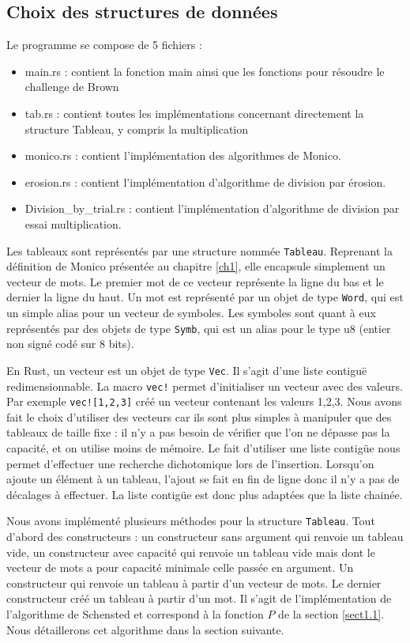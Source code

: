 \subsection{Choix des structures de données}
Le programme se compose de 5 fichiers : 
\begin{itemize}[label=-, parsep=0cm, itemsep=0cm]
	\item main.rs : contient la fonction main ainsi que les fonctions pour résoudre le challenge de Brown
	\item tab.rs : contient toutes les implémentations concernant directement la structure Tableau, y compris la multiplication
	\item monico.rs : contient l'implémentation des algorithmes de Monico.
	\item erosion.rs : contient l'implémentation d'algorithme de division par érosion.
	\item Division\_by\_trial.rs : contient l'implémentation d'algorithme de division par essai multiplication. 
\end{itemize}

Les tableaux sont représentés par une structure nommée \texttt{Tableau}. Reprenant la définition de Monico présentée au chapitre \ref{ch1}, elle encapsule simplement un vecteur de mots. Le premier mot de ce vecteur représente la ligne du bas et le dernier la ligne du haut. Un mot est représenté par un objet de type \texttt{Word}, qui est un simple alias pour un vecteur de symboles. Les symboles sont quant à eux représentés par des objets de type \texttt{Symb}, qui est un alias pour le type u8 (entier non signé codé sur 8 bits). 

En Rust, un vecteur est un objet de type \texttt{Vec}. Il s'agit d'une liste contiguë redimensionnable. La macro \texttt{vec!} permet d'initialiser un vecteur avec des valeurs. Par exemple \texttt{vec![1,2,3]} créé un vecteur contenant les valeurs 1,2,3. Nous avons fait le choix d'utiliser des vecteurs car ils sont plus simples à manipuler que des tableaux de taille fixe : il n'y a pas besoin de vérifier que l'on ne dépasse pas la capacité, et on utilise moins de mémoire. Le fait d'utiliser une liste contigüe nous permet d'effectuer une recherche dichotomique lors de l'insertion. Lorsqu'on ajoute un élément à un tableau, l'ajout se fait en fin de ligne donc il n'y a pas de décalages à effectuer. La liste contigüe est donc plus adaptées que la liste chainée.

Nous avons implémenté plusieurs méthodes pour la structure \texttt{Tableau}. Tout d'abord des constructeurs : un constructeur sans argument qui renvoie un tableau vide, un constructeur avec capacité qui renvoie un tableau vide mais dont le vecteur de mots a pour capacité minimale celle passée en argument. Un constructeur qui renvoie un tableau à partir d'un vecteur de mots. Le dernier constructeur créé un tableau à partir d'un mot. Il s'agit de l'implémentation de l'algorithme de Schensted et correspond à la fonction $P$ de la section \ref{sect1.1}. Nous détaillerons cet algorithme dans la section suivante. 

